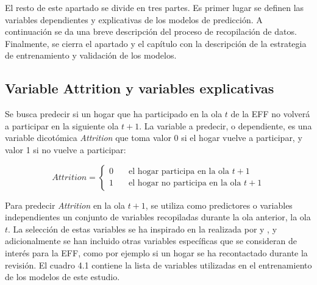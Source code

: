 El resto de este apartado se divide en tres partes. Es primer lugar se definen las variables dependientes y explicativas de los modelos de predicción. A continuación se da una breve descripción del proceso de recopilación de datos. Finalmente, se cierra el apartado y el capítulo con la descripción de la estrategia de entrenamiento y validación de los modelos.

\subsection{Variable Attrition y variables explicativas}

Se busca predecir si un hogar que ha participado en la ola $t$ de la EFF no volverá a participar en la siguiente ola $t+1$. La variable a predecir, o dependiente, es una variable dicotómica \textit{Attrition} que toma valor 0 si el hogar vuelve a participar, y valor 1 si no vuelve a participar:

\begin{equation}
Attrition =
  \begin{cases}
    0       & \quad \text{el hogar participa en la ola $t+1$} \\
    1  & \quad \text{el hogar no participa en la ola $t+1$}
  \end{cases}
\end{equation}

Para predecir \textit{Attrition} en la ola $t+1$, se utiliza como predictores o variables independientes un conjunto de variables recopiladas durante la ola anterior, la ola $t$. La selección de estas variables se ha inspirado en la realizada por \cite{beste2023case} y \cite{kern2021predicting}, y adicionalmente se han incluido otras variables específicas que se consideran de interés para la EFF, como por ejemplo si un hogar se ha recontactado durante la revisión. El cuadro 4.1 contiene la lista de variables utilizadas en el entrenamiento de los modelos de este estudio.

